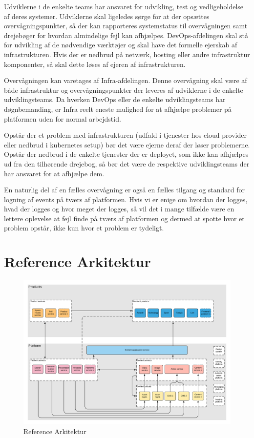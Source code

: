 \documentclass{article}
\begin{document}
Udviklerne i de enkelte teams har ansvaret for udvikling, test og vedligeholdelse af deres systemer. Udviklerne skal ligeledes sørge for at der opsættes overvågningspunkter, så der kan rapporteres systemstatus til overvågningen samt drejebøger for hvordan almindelige fejl kan afhjælpes.
DevOps-afdelingen skal stå for udvikling af de nødvendige værktøjer og skal have det formelle ejerskab af infrastrukturen. Hvis der er nedbrud på netværk, hosting eller andre infrastruktur komponenter, så skal dette løses af ejeren af infrastrukturen.

Overvågningen kan varetages af Infra-afdelingen. Denne overvågning skal være af både infrastruktur og overvågningspunkter der leveres af udviklerne i de enkelte udviklingsteams. Da hverken DevOps eller de enkelte udviklingsteams har døgnbemanding, er Infra reelt eneste mulighed for at afhjælpe problemer på platformen uden for normal arbejdstid.

Opstår der et problem med infrastrukturen (udfald i tjenester hos cloud provider eller nedbrud i kubernetes setup) bør det være ejerne deraf der løser problemerne. Opstår der nedbrud i de enkelte tjenester der er deployet, som ikke kan afhjælpes ud fra den tilhørende drejebog, så bør det være de respektive udviklingsteams der har ansvaret for at afhjælpe dem.

En naturlig del af en fælles overvågning er også en fælles tilgang og standard for logning af events på tværs af platformen. Hvis vi er enige om hvordan der logges, hvad der logges og hvor meget der logges, så vil det i mange tilfælde være en lettere oplevelse at fejl finde på tværs af platformen og dermed at spotte hvor et problem opstår, ikke kun hvor et problem er tydeligt. 

\section{Reference Arkitektur}
\begin{figure}[H]
\includegraphics[width=\textwidth]{Konceptuel_arkitektur_Eksemplificeret.png}
\caption{Reference Arkitektur}
\end{figure}
\end{document}
